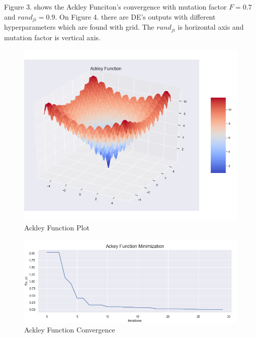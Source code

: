 \documentclass[A4, twocolumn]{article}
\begin{document}
	 Figure 3. shows the Ackley Funciton's convergence with mutation factor $F = 0.7$ and $rand_{ji} = 0.9$. On Figure 4. there are DE's outputs with different hyperparameters which are found with grid. The $rand_{ji}$ is horizontal axis and mutation factor is vertical axis.
	 \begin{figure}
	 	\includegraphics[width=\linewidth]{ackley/ackley_plot.png}
	 	\caption{Ackley Function Plot}
	 	\label{fig:Ackley Function Plot}
	 \end{figure}
 
  
	 \begin{figure}
	 	\includegraphics[width=\linewidth]{ackley/ackley_convergence.png}
	 	\caption{Ackley Function Convergence}
	 	\label{fig:Ackley Function Convergence}
	 \end{figure}
 
\end{document}
